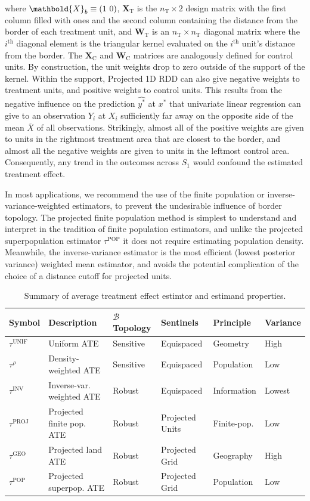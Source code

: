 \documentclass[letter]{article}
\DeclarePairedDelimiter{\parenthesis}{\lparen}{\rparen}
\newcommand{\del}[1]{\parenthesis*{#1}}
\newcommand{\treat}{\mathrm{T}}
\newcommand{\ctrol}{\mathrm{C}}
\newcommand{\border}{\mathcal{B}}
\newcommand{\unifavg}{\tau^{\mathrm{UNIF}}}
\newcommand{\invvar}{\tau^{\mathrm{INV}}}
\newcommand{\taurho}{\tau^{\rho}}
\newcommand{\tauproj}{\tau^{\mathrm{PROJ}}}
\newcommand{\taugeo}{\tau^{\mathrm{GEO}}}
\newcommand{\taupop}{\tau^{\mathrm{POP}}}
\newcommand{\Xmat}{\mathbold{X}}
\newcommand{\Wmat}{\mathbold{W}}
\begin{document}
where \(\Xmat_b \equiv \del{1~0}\), \(\Xmat_\treat\) is the \(n_\treat \times 2\) design matrix with the first column filled with ones and the second column containing the distance from the border of each treatment unit, and \(\Wmat_\treat\) is an \(n_\treat \times n_\treat\) diagonal matrix where the \(i^\mathrm{th}\) diagonal element is the triangular kernel evaluated on the \(i^\mathrm{th}\) unit's distance from the border.
The \(\Xmat_\ctrol\) and \(\Wmat_\ctrol\) matrices are analogously defined for control units.
By construction, the unit weights drop to zero outside of the support of the kernel.
Within the support, Projected 1D RDD can also give negative weights to treatment units, and positive weights to control units.
This results from the negative influence on the prediction \(\widehat{y^*}\) at \(x^*\) that univariate linear regression can give to an observation \(Y_i\) at \(X_i\) sufficiently far away on the opposite side of the mean \(\overline{X}\) of all observations.
Strikingly, almost all of the positive weights are given to units in the rightmost treatment area that are closest to the border, and almost all the negative weights are given to units in the leftmost control area.
Consequently, any trend in the outcomes across \(S_1\) would confound the estimated treatment effect.

In most applications, we recommend the use of the finite population or inverse-variance-weighted estimators, to prevent the undesirable influence of border topology.
The projected finite population method is simplest to understand and interpret in the tradition of finite population estimators, and unlike the projected superpopulation estimator \(\taupop\) it does not require estimating population density.
Meanwhile, the inverse-variance estimator is the most efficient (lowest posterior variance) weighted mean estimator,
and avoids the potential complication of the choice of a distance cutoff for projected units.
    

\begin{table}[tbp]
\centering
\caption{Summary of average treatment effect estimtor and estimand properties.}
\begin{tabular}{llllll}
\hline
Symbol     & Description                     & $\border$ Topology & Sentinels       & Principle         & Variance \\
\hline
$\unifavg$ & Uniform ATE                     & Sensitive       & Equispaced      & Geometry    & High     \\
$\taurho$  & Density-weighted ATE            & Sensitive       & Equispaced      & Population  & Low      \\
$\invvar$  & Inverse-var. weighted ATE   & Robust          & Equispaced      & Information & Lowest   \\
$\tauproj$ & Projected finite pop. ATE & Robust          & Projected Units & Finite-pop. & Low      \\
$\taugeo$  & Projected land ATE              & Robust          & Projected Grid  & Geography   & High     \\
$\taupop$  & Projected superpop. ATE   & Robust          & Projected Grid  & Population  & Low     
\end{tabular}
\label{table:estimator_properties}
\end{table}
\end{document}
